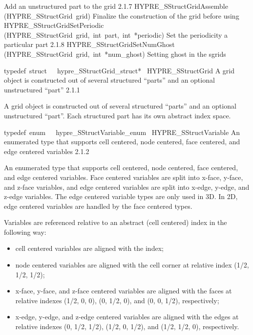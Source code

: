 \documentclass{article}
\begin{document}
\begin{cxxentry}
\begin{cxxentry}
\begin{cxxnames}
        {
Add an unstructured part to the grid}
        {2.1.7}
        {HYPRE\_SStructGridAssemble}
        {(HYPRE\_SStructGrid\ grid)}
        {
Finalize the construction of the grid before using}
        {}
\label{cxx.2.1.12}
        {HYPRE\_SStructGridSetPeriodic}
        {(HYPRE\_SStructGrid\ grid,\ int\ part,\ int\ *periodic)}
        {
Set the periodicity a particular part}
        {2.1.8}
        {HYPRE\_SStructGridSetNumGhost}
        {(HYPRE\_SStructGrid\ grid,\ int\ *num\_ghost)}
        {
Setting ghost in the sgrids}
        {}
\label{cxx.2.1.13}
\end{cxxnames}
\begin{cxxmacro}
{typedef\ struct\ \ \ hypre\_SStructGrid\_struct*\ }
        {HYPRE\_SStructGrid}
        {}
        {
A grid object is constructed out of several structured ``parts'' and an
optional unstructured ``part''}
        {2.1.1}
\begin{cxxdoc}

A grid object is constructed out of several structured ``parts'' and an
optional unstructured ``part''.  Each structured part has its own abstract
index space.
\end{cxxdoc}
\end{cxxmacro}
\begin{cxxmacro}
{typedef\ enum\ \ \ hypre\_SStructVariable\_enum\ }
        {HYPRE\_SStructVariable}
        {}
        {
An enumerated type that supports cell centered, node centered, face centered,
and edge centered variables}
        {2.1.2}
\begin{cxxdoc}

An enumerated type that supports cell centered, node centered, face centered,
and edge centered variables.  Face centered variables are split into x-face,
y-face, and z-face variables, and edge centered variables are split into
x-edge, y-edge, and z-edge variables.  The edge centered variable types are
only used in 3D.  In 2D, edge centered variables are handled by the face
centered types.

Variables are referenced relative to an abstract (cell centered) index in the
following way:
\begin{itemize}
\item cell centered variables are aligned with the index;
\item node centered variables are aligned with the cell corner
at relative index (1/2, 1/2, 1/2);
\item x-face, y-face, and z-face centered variables are aligned
with the faces at relative indexes (1/2, 0, 0), (0, 1/2, 0),
and (0, 0, 1/2), respectively;
\item x-edge, y-edge, and z-edge centered variables are aligned
with the edges at relative indexes (0, 1/2, 1/2), (1/2, 0, 1/2),
and (1/2, 1/2, 0), respectively.
\end{itemize}


\end{cxxdoc}
\end{cxxmacro}
\end{cxxentry}
\end{cxxentry}
\end{document}
